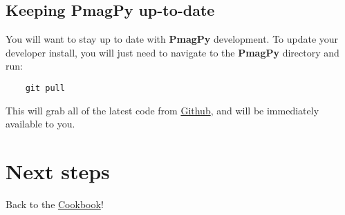 \documentclass[11pt]{article}
\begin{document}
\subsection{Keeping PmagPy up-to-date}

    You will want to stay up to date with {\bf PmagPy} development.  To update your developer install, you will just need to navigate to the {\bf PmagPy} directory and run:

\begin{verbatim}
    git pull
\end{verbatim}

This will grab all of the latest code from \href{https://github.com/PmagPy/PmagPy}{Github}, and will be immediately available to you.

\section{Next steps}

Back to the \href{https://earthref.org/PmagPy/cookbook/#next_steps}{Cookbook}!
\end{document}
